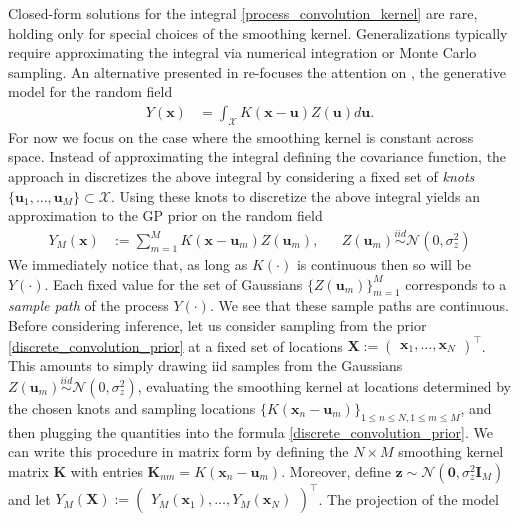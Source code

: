 \documentclass[12pt]{article}
\newcommand{\zeroVec}{\mathbf{0}}
\newcommand{\Gaussian}{\mathcal{N}}
\newcommand{\I}{\mathbf{I}}
\newcommand{\Ker}{K}
\newcommand{\locSpace}{\mathcal{X}}
\newcommand{\loc}{\mathbf{x}}
\newcommand{\locDum}{\mathbf{u}}
\newcommand{\locMat}{\mathbf{X}}
\newcommand{\rf}{Y}
\newcommand{\numKnot}{M}
\newcommand{\knotIdx}{m}
\newcommand{\kerMat}{\mathbf{K}}
\begin{document}
Closed-form solutions for the integral \ref{process_convolution_kernel} are rare, holding only for special choices of the smoothing kernel. Generalizations typically require approximating
the integral via numerical integration or Monte Carlo sampling. An alternative presented in \cite{Higdon} re-focuses the attention on \cite{process_convolution}, the generative model for the random 
field 
\begin{align*}
\rf(\loc) &= \int_{\locSpace} \Ker(\loc - \locDum) Z(\locDum) d\locDum.
\end{align*}
For now we focus on the case where the smoothing kernel is constant across space. 
Instead of approximating the integral defining the covariance function, the approach in \cite{Higdon} discretizes the above integral by considering a fixed set of \textit{knots}
$\{\locDum_1, \dots, \locDum_{\numKnot}\} \subset \locSpace$. Using these knots to discretize the above integral yields an approximation to the GP prior on the random field
\begin{align}
\rf_{\numKnot}(\loc) &:= \sum_{\knotIdx = 1}^{\numKnot}  \Ker(\loc - \locDum_{\knotIdx}) Z(\locDum_{\knotIdx}), &&Z(\locDum_{\knotIdx}) \overset{iid}{\sim} \Gaussian(0, \sigma_{z}^2) \label{discrete_convolution_prior}
\end{align}
We immediately notice that, as long as $\Ker(\cdot)$ is continuous then so will be $Y(\cdot)$. Each fixed value for the set of Gaussians $\{Z(\locDum_{\knotIdx})\}_{\knotIdx = 1}^{\numKnot}$ 
corresponds to a \textit{sample path} of the process $\rf(\cdot)$. We see that these sample paths are continuous. Before considering inference, let us consider sampling from the prior 
\ref{discrete_convolution_prior} at a fixed set of locations $\locMat := \begin{pmatrix} \loc_1, \dots, \loc_N \end{pmatrix}^\top$. This amounts to simply drawing iid samples from the Gaussians 
$Z(\locDum_{\knotIdx}) \overset{iid}{\sim} \Gaussian(0, \sigma_{z}^2)$, evaluating the smoothing kernel at locations determined by the chosen knots and sampling locations 
$\{\Ker(\loc_n - \locDum_{\knotIdx})\}_{1 \leq n \leq N, 1 \leq \knotIdx \leq \numKnot}$, and then plugging the quantities into the formula \ref{discrete_convolution_prior}. We can write this procedure 
in matrix form by defining the $N \times \numKnot$ smoothing kernel matrix $\kerMat$ with entries $\kerMat_{n \knotIdx} = \Ker(\loc_{n} - \locDum_{\knotIdx})$. Moreover, define 
$\mathbf{z} \sim \Gaussian(\zeroVec, \sigma_{z}^2 \I_{\numKnot})$ and let $\rf_{\numKnot}(\locMat) := \begin{pmatrix} \rf_{\numKnot}(\loc_1), \dots, \rf_{\numKnot}(\loc_N) \end{pmatrix}^\top$. The projection of the model 
\end{document}
